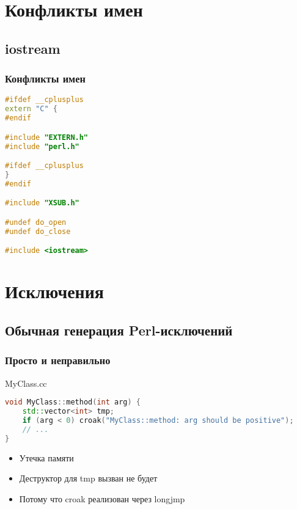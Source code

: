 \documentclass[pdflatex,hyperref={unicode=true}]{beamer}
\begin{document}
\section{Конфликты имен}

\subsection{iostream}
\begin{frame}[fragile]
    \frametitle{Конфликты имен}
    \begin{lstlisting}[language=C++,style=PerlXS]
#ifdef __cplusplus
extern "C" {
#endif

#include "EXTERN.h"
#include "perl.h"

#ifdef __cplusplus
}
#endif

#include "XSUB.h"

#undef do_open
#undef do_close

#include <iostream>
    \end{lstlisting}
\end{frame}

\section{Исключения}

\subsection{Обычная генерация Perl-исключений}
\begin{frame}[fragile]
    \frametitle{Просто и неправильно}
    MyClass.cc
    \begin{lstlisting}[language=C++,style=PerlXS]
void MyClass::method(int arg) {
    std::vector<int> tmp;
    if (arg < 0) croak("MyClass::method: arg should be positive");
    // ...
}
    \end{lstlisting}
    \begin{itemize}
        \item<2-| alert@2-> Утечка памяти
        \item<3-> Деструктор для tmp вызван не будет
        \item<4-> Потому что croak реализован через longjmp
    \end{itemize}
\end{frame}
\end{document}
